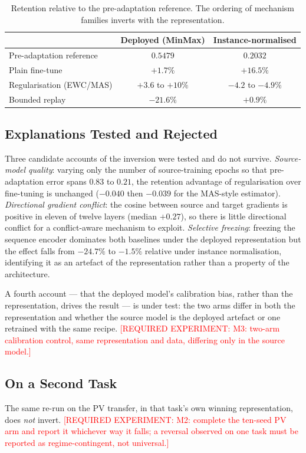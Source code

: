 \documentclass[journal]{IEEEtran}
\newcommand{\needexp}[1]{\textcolor{red}{[REQUIRED EXPERIMENT: #1]}}
\begin{document}
\begin{table}[t]
\centering
\caption{Retention relative to the pre-adaptation reference. The ordering of
mechanism families inverts with the representation.}
\label{tab:inversion}
\begin{tabular}{@{}lcc@{}}
\toprule
& Deployed (MinMax) & Instance-normalised \\
\midrule
Pre-adaptation reference & $0.5479$ & $0.2032$ \\
\midrule
Plain fine-tune & $+1.7\%$ & $+16.5\%$ \\
Regularisation (EWC/MAS) & $+3.6$ to $+10\%$ & $\mathbf{-4.2}$ to $\mathbf{-4.9\%}$ \\
Bounded replay & $\mathbf{-21.6\%}$ & $+0.9\%$ \\
\bottomrule
\end{tabular}
\end{table}

\subsection{Explanations Tested and Rejected}
Three candidate accounts of the inversion were tested and do not survive.
\emph{Source-model quality}: varying only the number of source-training epochs
so that pre-adaptation error spans $0.83$ to $0.21$, the retention advantage of
regularisation over fine-tuning is unchanged ($-0.040$ then $-0.039$ for the
MAS-style estimator).
\emph{Directional gradient conflict}: the cosine between source and target
gradients is positive in eleven of twelve layers (median $+0.27$), so there is
little directional conflict for a conflict-aware mechanism to exploit.
\emph{Selective freezing}: freezing the sequence encoder dominates both
baselines under the deployed representation but the effect falls from $-24.7\%$
to $-1.5\%$ relative under instance normalisation, identifying it as an artefact
of the representation rather than a property of the architecture.

A fourth account --- that the deployed model's calibration bias, rather than the
representation, drives the result --- is under test: the two arms differ in both
the representation and whether the source model is the deployed artefact or one
retrained with the same recipe. \needexp{M3: two-arm calibration control, same
representation and data, differing only in the source model.}

\subsection{On a Second Task}
The same re-run on the PV transfer, in that task's own winning representation,
does \emph{not} invert. \needexp{M2: complete the ten-seed PV arm and report it
whichever way it falls; a reversal observed on one task must be reported as
regime-contingent, not universal.}
\end{document}

